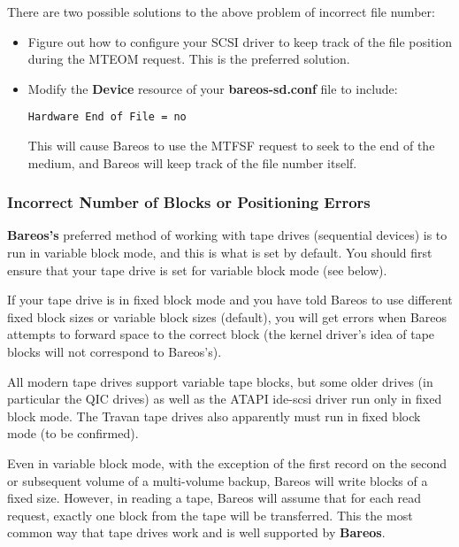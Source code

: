 {There are two possible solutions to the above problem of incorrect file
number:

\begin{itemize}
\item Figure out how to configure your SCSI driver to  keep track of the file
   position during the MTEOM  request. This is the preferred solution.
\item Modify the {\bf Device} resource of your {\bf bareos-sd.conf} file  to
   include:

\footnotesize
\begin{verbatim}
Hardware End of File = no
\end{verbatim}
\normalsize

This will cause Bareos to use the MTFSF request to  seek to the end of the
medium, and Bareos will keep  track of the file number itself.
\end{itemize}

\label{IncorrectBlocks}
\subsubsection{Incorrect Number of Blocks or Positioning Errors}

{\bf Bareos's} preferred method of working with tape drives (sequential
devices) is to run in variable block mode, and this is what is set by default.
You should first ensure that your tape drive is set for variable block mode
(see below).

If your tape drive is in fixed block mode and you have told Bareos to use
different fixed block sizes or variable block sizes (default), you will get
errors when Bareos attempts to forward space to the correct block (the kernel
driver's idea of tape blocks will not correspond to Bareos's).

All modern tape drives support variable tape blocks, but some older drives (in
particular the QIC drives) as well as the ATAPI ide-scsi driver run only in
fixed block mode. The Travan tape drives also apparently must run in fixed
block mode (to be confirmed).

Even in variable block mode, with the exception of the first record on the
second or subsequent volume of a multi-volume backup, Bareos will write blocks
of a fixed size. However, in reading a tape, Bareos will assume that for each
read request, exactly one block from the tape will be transferred. This the
most common way that tape drives work and is well supported by {\bf Bareos}.

}
